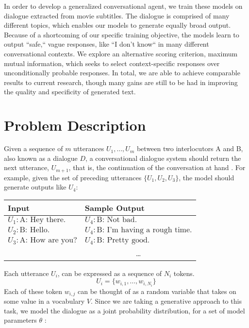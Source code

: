 \documentclass[11pt]{article}
\begin{document}
\noindent In order to develop a generalized conversational agent, we train these models on dialogue extracted from movie subtitles. The dialogue is comprised of many different topics, which enables our models to generate equally broad output. Because of a shortcoming of our specific training objective, the models learn to output ``safe,`` vague responses, like ``I don't know`` in many different conversational contexts. We explore an alternative scoring criterion, maximum mutual information, which seeks to select context-specific responses over unconditionally probable responses. In total, we are able to achieve comparable results to current research, though many gains are still to be had in improving the quality and specificity of generated text.

\section{Problem Description}

Given a sequence of $m$ utterances $U_1, \dots, U_m$ between two interlocutors A and B, also known as a dialogue $D$, a conversational dialogue system should return the next utterance, $U_{m+1}$, that is, the continuation of the conversation at hand \cite{serban}. For example, given the set of preceding utterances $\{U_1, U_2, U_3\}$, the model should generate outputs like $U_4$:

\begin{center}
  \begin{tabular}{| l | l |}
    \hline
    Input & Sample Output \\ \hline

$U_1: \text{A: Hey there.}$ & $U_4: \text{B: Not bad.}$\\ 
$U_2: \text{B: Hello.}$ &  $U_4: \text{B: I'm having a rough time.}$ \\ 
$U_3: \text{A: How are you?}$ & $U_4: \text{B: Pretty good.}$\\
&  \multicolumn{1}{|c|}{\dots} \\\hline
  \end{tabular}
\end{center}

\noindent Each utterance $U_i$, can be expressed as a sequence of $N_i$ tokens.  
$$U_i = \{w_{i,1}, \dots, w_{i,N_i}\}$$
Each of these token $w_{i,j}$ can be thought of as a random variable that takes on some value in a vocabulary $V$. Since we are taking a generative approach to this task, we model the dialogue as a joint probability distribution, for a set of model parameters $\theta$ \cite{serban}:
\end{document}
